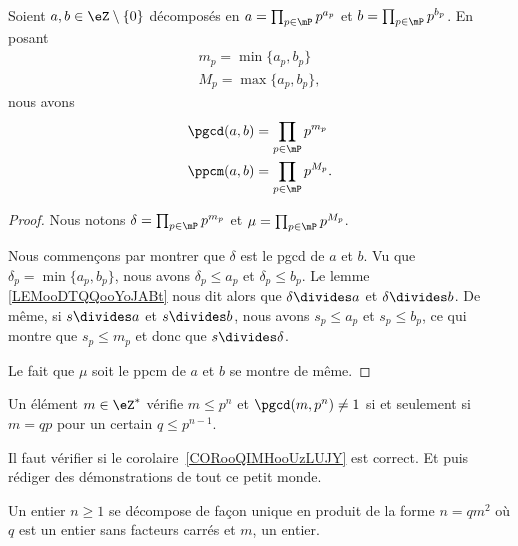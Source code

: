 \begin{proposition}     \label{PROPooNQBOooHWqTvs}
    Soient \( a,b\in \eZ\setminus\{ 0 \}\) décomposés en \( a=\prod_{p\in\mP}p^{a_p}\) et \( b=\prod_{p\in\mP}p^{b_p}\). En posant 
    \begin{subequations}
        \begin{align}
            m_p=\min\{ a_p,b_p \}\\
            M_p=\max\{ a_p,b_p \},
        \end{align}
    \end{subequations}
    nous avons
    \begin{subequations}
        \begin{align}
            \pgcd(a,b)&=\prod_{p\in\mP}p^{m_p}\\
            \ppcm(a,b)&=\prod_{p\in\mP}p^{M_p}.
        \end{align}
    \end{subequations}
\end{proposition}

\begin{proof}
    Nous notons $\delta=\prod_{p\in\mP}p^{m_p}$ et $\mu=\prod_{p\in\mP}p^{M_p}$. 
    
    Nous commençons par montrer que \( \delta\) est le pgcd de \( a\) et \( b\). Vu que \( \delta_p=\min\{ a_p,b_p \}\), nous avons \( \delta_p\leq a_p\) et \( \delta_p\leq b_p\). Le lemme \ref{LEMooDTQQooYoJABt} nous dit alors que \( \delta\divides a\) et \( \delta\divides b\). De même, si \(s\divides a\) et \( s\divides b\), nous avons \( s_p\leq a_p\) et \( s_p\leq b_p\), ce qui montre que \( s_p\leq m_p\) et donc que \( s\divides \delta\).

    Le fait que \( \mu\) soit le ppcm de \( a\) et \( b\) se montre de même.
\end{proof}

\begin{corollary}  \label{CORooQIMHooUzLUJY}
    Un élément \( m\in \eZ^*\) vérifie \( m\leq p^n\) et \( \pgcd(m,p^n)\neq 1\) si et seulement si \( m=qp\) pour un certain \( q\leq p^{n-1}\).
\end{corollary}

\begin{probleme}
   Il faut vérifier si le corolaire~\ref{CORooQIMHooUzLUJY} est correct.
   Et puis rédiger des démonstrations de tout ce petit monde.
\end{probleme}

\begin{lemma}   \label{LemheKdsa}
    Un entier \( n\geq 1\) se décompose de façon unique en produit de la forme \( n=qm^2\) où \( q\) est un entier sans facteurs carrés et \( m\), un entier.
\end{lemma}

